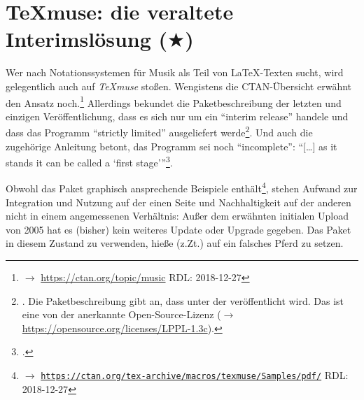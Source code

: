 %
%
%



\section{{\TeX}muse: die veraltete Interimslösung ($\bigstar$)}

Wer nach Notationssystemen für Musik als Teil von \LaTeX-Texten sucht, wird
gelegentlich auch auf \textit{{\TeX}muse} stoßen. Wengistens die CTAN-Übersicht
erwähnt den Ansatz noch.\footnote{$\rightarrow$
\href{https://ctan.org/topic/music} {https://ctan.org/topic/music} RDL:
2018-12-27} Allerdings bekundet die Paketbeschreibung der letzten und einzigen
Veröffentlichung, dass es sich nur um ein \enquote{in­terim re­lease} handele
und dass das Programm \enquote{strictly lim­ited} ausgeliefert
werde\footnote{\cite[vgl.][\nopage wp]{CtanTexmuse2005a}. Die Paket\-beschreibung
gibt an, dass  unter der 
veröffentlicht wird. Das ist eine von der  anerkannte
Open-Source-Lizenz ($\rightarrow$
\href{https://opensource.org/licenses/LPPL-1.3c}
{https://opensource.org/licenses/LPPL-1.3c}).}. Und auch die zugehörige
Anleitung betont, das Programm sei noch \enquote{incomplete}: \enquote{[\ldots]
as it stands it can be called a ‘first stage'}\footcite[vgl.][1]{Garcia2005a}.

Obwohl das Paket graphisch ansprechende Beispiele enthält\footnote{$\rightarrow$
\href{https://ctan.org/tex-archive/macros/texmuse/Samples/pdf/}
{\texttt{https://ctan.org/tex-archive/macros/texmuse/Samples/pdf/}} RDL:
2018-12-27}, stehen Aufwand zur Integration und Nutzung auf der einen Seite und
Nachhaltigkeit auf der anderen nicht in einem angemessenen Verhältnis: Außer dem
erwähnten initialen Upload von 2005 hat es (bisher) kein weiteres Update oder
Upgrade gegeben. Das Paket in diesem Zustand zu verwenden, hieße (z.Zt.) auf ein
falsches Pferd zu setzen.


%
